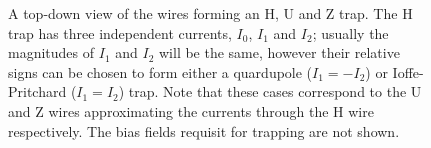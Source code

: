 \begin{figure}
  \centering
{}
  \caption{
    A top-down view of the wires forming an H, U and Z trap. The H trap has
    three independent currents, $I_0$, $I_1$ and $I_2$; usually the magnitudes
    of $I_1$ and $I_2$ will be the same, however their relative signs can be
    chosen to form either a quardupole ($I_1 = -I_2$) or Ioffe-Pritchard ($I_1 =
    I_2$) trap. Note that these cases correspond to the U and Z wires
    approximating the currents through the H wire respectively. The bias fields
    requisit for trapping are not shown.
  }
  \label{litrev:fig:trapvariations}
\end{figure}


